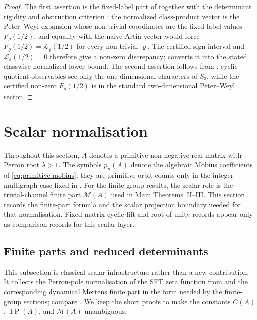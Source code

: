 \documentclass[11pt,a4paper]{amsart}
\theoremstyle{plain}
\theoremstyle{definition}
\theoremstyle{remark}
\DeclareMathOperator{\FP}{FP}
\begin{document}
\begin{proof}
  The first assertion is the fixed-label part of
   together with the determinant
  rigidity and obstruction criterion
  :
  the normalized class-product vector is the Peter--Weyl expansion whose
  non-trivial coordinates are the fixed-label values
  \(F_\varrho(1/2)\), and equality with the naive Artin vector would force
  \(F_\varrho(1/2)=\mathcal L_\varrho(1/2)\) for every non-trivial
  \(\varrho\).  The certified sign interval and
  \(\mathcal L_\varepsilon(1/2)=0\) therefore give a non-zero discrepancy;
   converts it into the stated classwise
  normalized lower bound.  The second assertion follows from
  : cyclic
  quotient observables see only the one-dimensional characters of
  \(S_3\), while the certified non-zero \(F_\rho(1/2)\) is in the standard
  two-dimensional Peter--Weyl sector.
\end{proof}


\section{Scalar normalisation}
\label{sec:finite-part}

Throughout this section, \(A\) denotes a primitive non-negative real
matrix with Perron root \(\lambda>1\). The symbols \(p_n(A)\) denote the
algebraic M\"obius coefficients of \eqref{eq:primitive-mobius}; they are
primitive orbit counts only in the integer multigraph case fixed in
. For the finite-group results, the scalar role is the
trivial-channel finite part \(\mathcal M(A)\) used in Main Theorems~II--III.
This section records the finite-part formula and the scalar projection boundary
needed for that normalisation.  Fixed-matrix cyclic-lift and root-of-unity
records appear only as comparison records for this scalar layer.

\subsection{Finite parts and reduced determinants}

This subsection is classical scalar infrastructure rather than a new
contribution.  It collects the Perron-pole normalisation of the SFT zeta
function from  and the corresponding
dynamical Mertens finite part in the form needed by the finite-group
sections; compare \cite{BowenLanford1970Zeta,Parry1983PrimeOrbit,Sharp1991Mertens,LindMarcus1995,ParryPollicott1990Zeta}.  We keep the
short proofs to make the constants \(C(A)\), \(\FP(A)\), and
\(\mathcal M(A)\) unambiguous.
\end{document}
